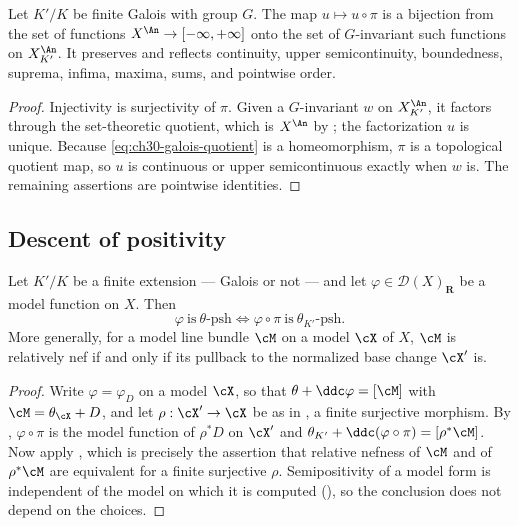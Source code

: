 \begin{corollary}
\label{cor:ch30-invariant-functions}
Let \(K'/K\) be finite Galois with group \(G\).  The map
\(u\mapsto u\circ\pi\) is a bijection from the set of functions
\(X^{\An}\to[-\infty,+\infty]\) onto the set of \(G\)-invariant such
functions on \(X_{K'}^{\An}\).  It preserves and reflects continuity, upper
semicontinuity, boundedness, suprema, infima, maxima, sums, and pointwise
order.
\end{corollary}

\begin{proof}
Injectivity is surjectivity of \(\pi\).  Given a \(G\)-invariant \(w\) on
\(X_{K'}^{\An}\), it factors through the set-theoretic quotient, which is
\(X^{\An}\) by ; the factorization
\(u\) is unique.  Because \eqref{eq:ch30-galois-quotient} is a
homeomorphism, \(\pi\) is a topological quotient map, so \(u\) is continuous
or upper semicontinuous exactly when \(w\) is.  The remaining assertions are
pointwise identities.
\end{proof}

\subsection{Descent of positivity}
\label{sec:ch30-descent-positivity}

\begin{theorem}
\label{thm:ch30-model-psh-descent}
Let \(K'/K\) be a finite extension --- Galois or not --- and let
\(\varphi\in\mathcal D(X)_{\mathbf R}\) be a model function on \(X\).  Then
\[
 \varphi\ \text{is}\ \theta\text{-psh}
 \iff
 \varphi\circ\pi\ \text{is}\ \theta_{K'}\text{-psh}.
\]
More generally, for a model line bundle \(\cM\) on a model \(\cX\) of
\(X\), \(\cM\) is relatively nef if and only if its pullback to the
normalized base change \(\cX'\) is.
\end{theorem}

\begin{proof}
Write \(\varphi=\varphi_D\) on a model \(\cX\), so that
\(\theta+\ddc\varphi=[\cM]\) with \(\cM=\theta_{\cX}+D\), and let
\(\rho:\cX'\to\cX\) be as in , a finite
surjective morphism.  By
, \(\varphi\circ\pi\) is the
model function of \(\rho^*D\) on \(\cX'\) and
\(\theta_{K'}+\ddc(\varphi\circ\pi)=[\rho^*\cM]\).  Now apply
, which is precisely the assertion
that relative nefness of \(\cM\) and of \(\rho^*\cM\) are equivalent for a
finite surjective \(\rho\).  Semipositivity of a model form is independent
of the model on which it is computed
(), so the conclusion does not
depend on the choices.
\end{proof}

